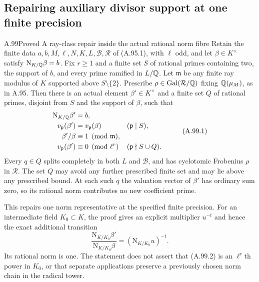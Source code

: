 \subsection{Repairing auxiliary divisor support at one finite precision}

\begin{statement}{A.99}{Proved}
{A ray-class repair inside the actual rational norm fibre}
Retain the finite data $a,b,M,\ell,N,K,L,\mathcal B,\mathcal R$
of (A.95.1), with $\ell$ odd, and let
$\beta\in K^\times$ satisfy $\mathrm N_{K/\mathbb Q}\beta=b$.
Fix $r\ge1$ and a finite set $S$ of rational primes containing
two, the support of $b$, and every prime ramified in $L/\mathbb Q$.
Let $\mathfrak m$ be any finite ray modulus of $K$ supported
above $S\setminus\{2\}$.
Prescribe $\rho\in\operatorname{Gal}(\mathcal R/\mathbb Q)$ fixing
$\mathbb Q(\mu_M)$, as in A.95.
Then there is an actual element $\beta'\in K^\times$ and a
finite set $Q$ of rational primes, disjoint from $S$ and the
support of $\beta$, such that
\[
\begin{aligned}
 \mathrm N_{K/\mathbb Q}\beta'&=b,\\
 v_{\mathfrak p}(\beta')&=v_{\mathfrak p}(\beta)
                                  &&(\mathfrak p\mid S),\\
 \beta'/\beta&\equiv1\pmod{\mathfrak m},\\
 v_{\mathfrak p}(\beta')&\equiv0\pmod{\ell^r}
                                  &&(\mathfrak p\nmid S\cup Q).
\end{aligned}
 \tag{A.99.1}
\]
Every $q\in Q$ splits completely in both $L$ and
$\mathcal B$, and has cyclotomic Frobenius $\rho$ in
$\mathcal R$.
The set $Q$ may avoid any further prescribed finite set and
may lie above any prescribed bound.
At each such $q$ the valuation vector of $\beta'$ has
ordinary sum zero, so its rational norm contributes no
new coefficient prime.

This repairs one norm representative at the specified
finite precision.  For an intermediate field $K_0\subset K$,
the proof gives an explicit multiplier $u^{-t}$ and hence
the exact additional transition
\[
 \frac{\mathrm N_{K/K_0}\beta'}{\mathrm N_{K/K_0}\beta}
                         =(\mathrm N_{K/K_0}u)^{-t}.
 \tag{A.99.2}
\]
Its rational norm is one.  The statement does not assert
that (A.99.2) is an $\ell^r$th power in $K_0$, or that
separate applications preserve a previously chosen norm
chain in the radical tower.
\end{statement}

